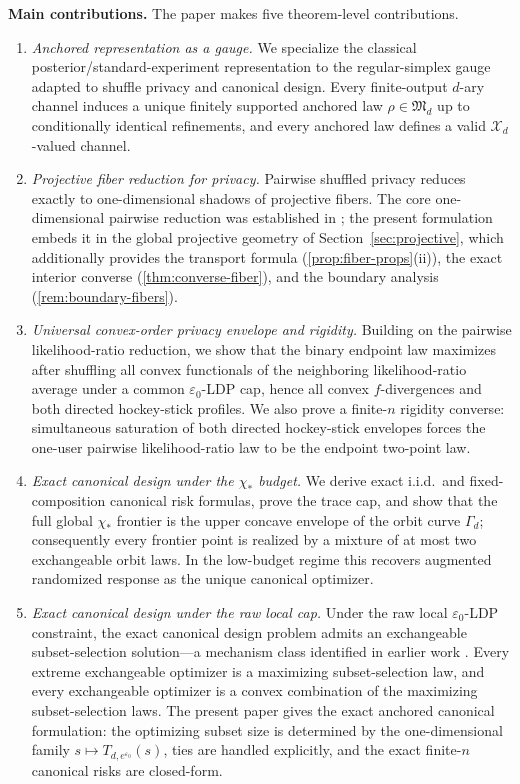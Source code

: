 \documentclass[11pt]{amsart}
\theoremstyle{definition}
\newcommand{\cX}{\mathcal X}
\newcommand{\fM}{\mathfrak M}
\begin{document}
\medskip
\noindent\textbf{Main contributions.}
The paper makes five theorem-level contributions.

\begin{enumerate}[label=\textup{(\arabic*)}]
\item \emph{Anchored representation as a gauge.}
We specialize the classical posterior/standard-experiment representation to the regular-simplex gauge adapted to shuffle privacy and canonical design. Every finite-output $d$-ary channel induces a unique finitely supported anchored law $\rho\in\fM_d$ up to conditionally identical refinements, and every anchored law defines a valid $\cX_d$-valued channel.

\item \emph{Projective fiber reduction for privacy.}
Pairwise shuffled privacy reduces exactly to one-dimensional shadows of projective fibers. The core one-dimensional pairwise reduction was established in \cite{shvets-growing}; the present formulation embeds it in the global projective geometry of Section~\ref{sec:projective}, which additionally provides the transport formula (\cref{prop:fiber-props}(ii)), the exact interior converse (\cref{thm:converse-fiber}), and the boundary analysis (\cref{rem:boundary-fibers}).

\item \emph{Universal convex-order privacy envelope and rigidity.}
Building on the pairwise likelihood-ratio reduction, we show that the binary endpoint law maximizes after shuffling all convex functionals of the neighboring likelihood-ratio average under a common $\varepsilon_0$-LDP cap, hence all convex $f$-divergences and both directed hockey-stick profiles. We also prove a finite-$n$ rigidity converse: simultaneous saturation of both directed hockey-stick envelopes forces the one-user pairwise likelihood-ratio law to be the endpoint two-point law.

\item \emph{Exact canonical design under the $\chi_*$ budget.}
We derive exact i.i.d.\ and fixed-composition canonical risk formulas, prove the trace cap, and show that the full global $\chi_*$ frontier is the upper concave envelope of the orbit curve $\Gamma_d$; consequently every frontier point is realized by a mixture of at most two exchangeable orbit laws. In the low-budget regime this recovers augmented randomized response as the unique canonical optimizer.

\item \emph{Exact canonical design under the raw local cap.}
Under the raw local $\varepsilon_0$-LDP constraint, the exact canonical design problem admits an exchangeable subset-selection solution---a mechanism class identified in earlier work \cite{wang-ldp,ye-barg}. Every extreme exchangeable optimizer is a maximizing subset-selection law, and every exchangeable optimizer is a convex combination of the maximizing subset-selection laws. The present paper gives the exact anchored canonical formulation: the optimizing subset size is determined by the one-dimensional family $s\mapsto T_{d,e^{\varepsilon_0}}(s)$, ties are handled explicitly, and the exact finite-$n$ canonical risks are closed-form.
\end{enumerate}
\end{document}
